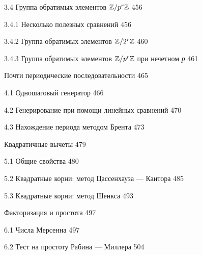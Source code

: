\documentclass{mai_book}
\begin{document}
{3.4 Группа обратимых элементов $\mathbb{Z}/\small{p}^{r}\mathbb{Z}$ \dotfill \hspace{0.5cm} 456
 
\hspace{0.5cm}3.4.1 Несколько полезных сравнений \dotfill \hspace{0.5cm} 456
 
\hspace{0.5cm}3.4.2 Группа обратимых элементов $\mathbb{Z}/\small{2}^{r}\mathbb{Z}$ \dotfill \hspace{0.5cm} 460
 
\hspace{0.5cm}3.4.3 Группа обратимых элементов $\mathbb{Z}/\small{p}^{r}\mathbb{Z}$ при нечетном \emph{р} \dotfill \hspace{0.5cm} 461

 \hspace{0.05cm}Почти периодические последовательности \dotfill \hspace{0.5cm} 465
 
4.1 Одношаговый генератор \dotfill \hspace{0.5cm} 466

\newpage
{}
4.2 Генерирование при помощи линейных сравнений \dotfill \hspace{0.5cm} 470

4.3 Нахождение периода методом Брента \dotfill \hspace{0.5cm} 473

 \hspace{0.05cm} Квадратичные вычеты \dotfill \hspace{0.5cm} 479

5.1 Общие свойства \dotfill \hspace{0.5cm} 480

5.2 Квадратные корни: метод Цассенхауза — Кантора \dotfill \hspace{0.5cm} 485

5.3 Квадратные корни: метод Шенкса \dotfill \hspace{0.5cm} 493

 \hspace{0.05cm} Факторизация и простота \dotfill \hspace{0.5cm} 497

6.1 Числа Мерсенна \dotfill \hspace{0.5cm} 497

6.2 Тест на простоту Рабина — Миллера \dotfill \hspace{0.5cm} 504 

}
\end{document}
